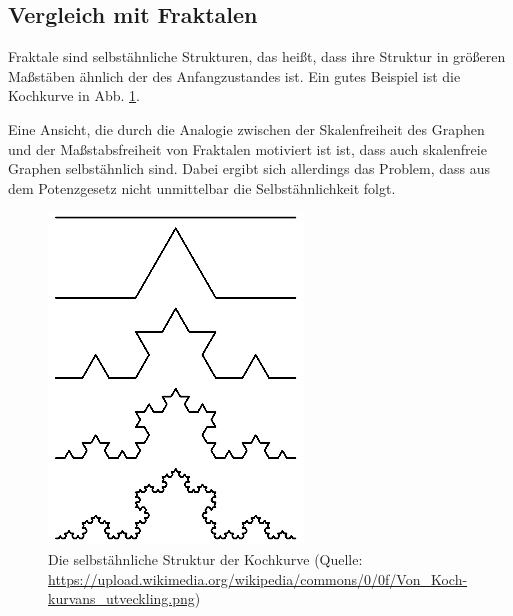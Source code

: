 \subsection{Vergleich mit Fraktalen}
Fraktale sind selbstähnliche Strukturen, das heißt, dass ihre Struktur in größeren Maßstäben ähnlich der des Anfangzustandes ist. Ein gutes Beispiel ist die Kochkurve in Abb. \ref{KK}.

Eine  Ansicht, die durch die Analogie zwischen der Skalenfreiheit des Graphen und der Maßstabsfreiheit von Fraktalen motiviert ist ist, dass auch skalenfreie Graphen selbstähnlich sind.
Dabei ergibt sich allerdings das Problem, dass aus dem Potenzgesetz nicht unmittelbar die Selbstähnlichkeit folgt.
\begin{figure}
\centering
\includegraphics[scale=0.5]{img/Kochkurve}
\caption{Die selbstähnliche Struktur der Kochkurve (Quelle: \url{https://upload.wikimedia.org/wikipedia/commons/0/0f/Von\_Koch-kurvans\_utveckling.png})}
 \label{KK}
\end{figure}
